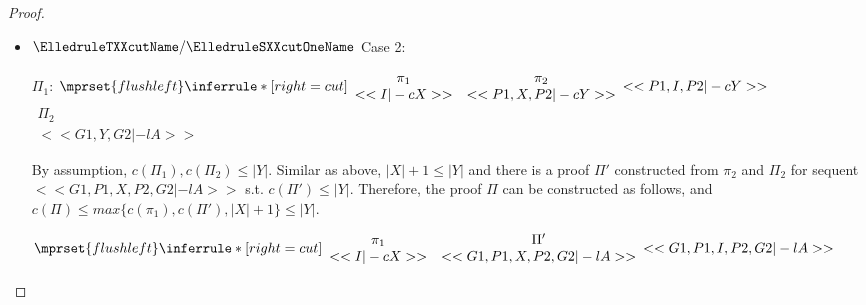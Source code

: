\begin{proof}
\begin{enumerate}
\begin{itemize}
    \item $\ElledruleTXXcutName/\ElledruleSXXcutOneName$ Case 2:
      \begin{center}
        \scriptsize
        $\Pi_1$:
        \begin{math}
          $$\mprset{flushleft}
          \inferrule* [right={\tiny cut}] {
            {
              \begin{array}{cc}
                \pi_1 & \pi_2 \\
                {<<I |-c X>>} & {<<P1, X, P2 |-c Y>>}
              \end{array}
            }
          }{<<P1, I, P2 |-c Y>>}
        \end{math}
        \qquad\qquad
        \begin{math}
          \begin{array}{c}
            \Pi_2 \\
            {<<G1, Y, G2 |-l A>>}
          \end{array}
        \end{math}
      \end{center}
      By assumption, $c(\Pi_1),c(\Pi_2)\leq |Y|$. Similar as above, $|X|+1\leq |Y|$ and there
      is a proof $\Pi'$ constructed from $\pi_2$ and $\Pi_2$ for sequent
      $<<G1, P1, X, P2, G2 |-l A>>$ s.t. $c(\Pi')\leq|Y|$. Therefore, the proof $\Pi$ can be
      constructed as follows, and $c(\Pi)\leq max\{c(\pi_1),c(\Pi'),|X|+1\}\leq |Y|$.
      \begin{center}
        \scriptsize
        \begin{math}
          $$\mprset{flushleft}
          \inferrule* [right={\tiny cut}] {
            {
              \begin{array}{cc}
                \pi_1 & \Pi'\\
                {<<I |-c X>>} & {<<G1, P1, X, P2, G2 |-l A>>}
              \end{array}
            }
          }{<<G1, P1, I, P2, G2 |-l A>>}
        \end{math}
      \end{center}


\end{itemize}
\end{enumerate}
\end{proof}

